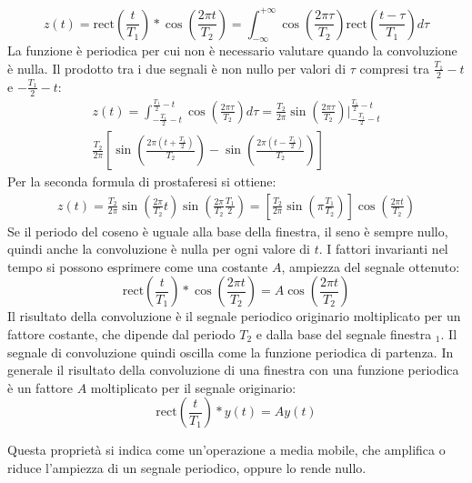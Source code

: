 \documentclass{article}
\numberwithin{equation}{subsection}
\begin{document}
\begin{equation*}
    z(t)=\mbox{rect}\displaystyle\left(\frac{t}{T_1}\right)*\cos\left(\frac{2\pi t}{T_2}\right)=\int_{-\infty}^{+\infty}\cos\left(\frac{2\pi \tau}{T_2}\right)\mbox{rect}\displaystyle\left(\frac{t-\tau}{T_1}\right)d\tau
\end{equation*}
La funzione è periodica per cui non è necessario valutare quando la convoluzione è nulla. Il prodotto tra i due segnali è non nullo per valori di $\tau$ compresi tra 
$\displaystyle\frac{T_1}{2}-t$ e $-\displaystyle\frac{T_1}{2}-t$:
\begin{gather*}
    z(t)=\displaystyle\int_{-\frac{T_1}{2}-t}^{\frac{T_1}{2}-t}\cos\left(\frac{2\pi\tau}{T_2}\right)d\tau=\frac{T_2}{2\pi}\sin\left(\frac{2\pi\tau}{T_2}\right)\Bigg|_{-\frac{T_1}{2}-t}^{\frac{T_1}{2}-t}\\
    \displaystyle\frac{T_2}{2\pi}\left[\sin\left(\frac{2\pi(t+\frac{T_1}{2})}{T_2}\right)-\sin\left(\frac{2\pi(t-\frac{T_1}{2})}{T_2}\right)\right]
\end{gather*}
Per la seconda formula di prostaferesi si ottiene:
\begin{gather*}
    z(t)=\displaystyle\frac{T_2}{2\pi}\sin\left(\frac{2\pi}{T_2}t\right)\sin\left(\frac{2\pi}{T_2}\frac{T_1}{2}\right)=\left[\frac{T_2}{2\pi}\sin\left(\pi\frac{T_1}{T_2}\right)\right]\cos\left(\frac{2\pi t}{T_2}\right)
\end{gather*}
Se il periodo del coseno è uguale alla base della finestra, il seno è sempre nullo, quindi anche la convoluzione è nulla per ogni valore di $t$. I fattori invarianti nel 
tempo si possono esprimere come una costante $A$, ampiezza del segnale ottenuto:
\begin{equation*}
    \mbox{rect}\left(\displaystyle\frac{t}{T_1}\right)*\cos\left(\frac{2\pi t}{T_2}\right)=A\cos\left(\frac{2\pi t}{T_2}\right)
\end{equation*}  
Il risultato della convoluzione è il segnale periodico originario moltiplicato per un fattore costante, che dipende dal periodo $T_2$ e dalla base del segnale finestra $_1$. 
Il segnale di convoluzione quindi oscilla come la funzione periodica di partenza. In generale il risultato della convoluzione di una finestra con una funzione periodica è un fattore 
$A$ moltiplicato per il segnale originario:
\begin{equation*}
    \mbox{rect}\left(\frac{t}{T_1}\right)*y(t)=Ay(t)
\end{equation*}

Questa proprietà si indica come un'operazione a media mobile, che amplifica o riduce l'ampiezza di un segnale periodico, oppure lo rende nullo. 
\end{document}
